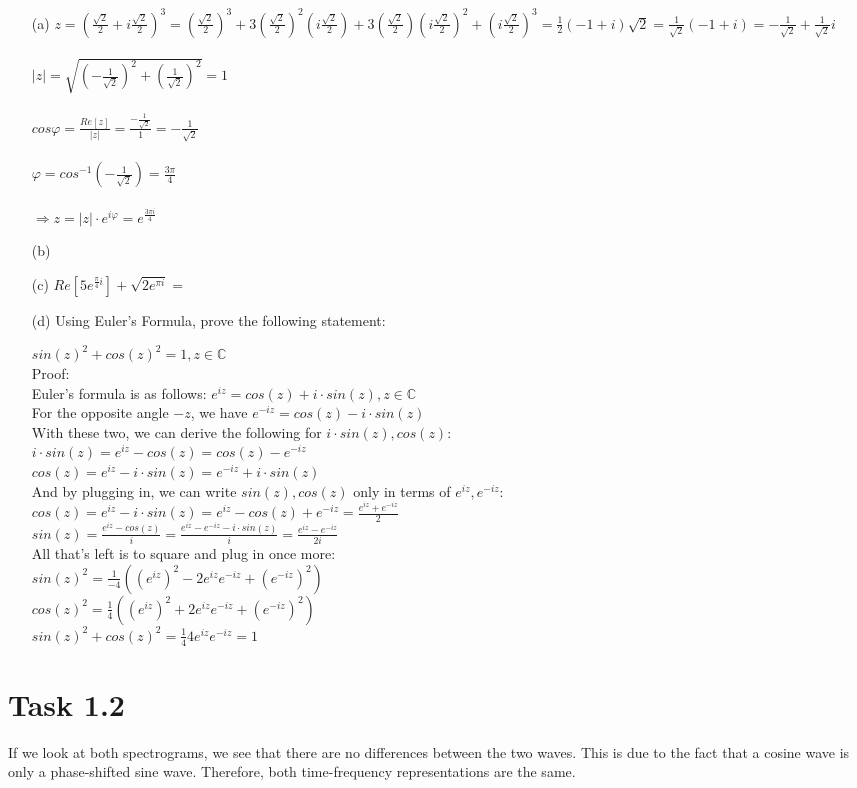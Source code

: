 \documentclass[12pt]{article}
\begin{document}
\begin{itemize}
    \item[(a)]
    $z = (\frac{\sqrt{2}}{2}+i\frac{\sqrt{2}}{2})^{3} = (\frac{\sqrt{2}}{2})^{3} + 3(\frac{\sqrt{2}}{2})^{2}(i\frac{\sqrt{2}}{2}) + 3(\frac{\sqrt{2}}{2})(i\frac{\sqrt{2}}{2})^{2} + (i\frac{\sqrt{2}}{2})^{3} = \frac{1}{2}(-1+i)\sqrt{2}=\frac{1}{\sqrt{2}}(-1+i)=-\frac{1}{\sqrt{2}}+\frac{1}{\sqrt{2}}i$\\\\
    $|z|=\sqrt{(-\frac{1}{\sqrt{2}})^{2}+(\frac{1}{\sqrt{2}})^{2}}=1$\\\\
    $cos\varphi=\frac{Re[z]}{|z|}=\frac{-\frac{1}{\sqrt{2}}}{1}=-\frac{1}{\sqrt{2}}$\\\\
    $\varphi=cos^{-1}(-\frac{1}{\sqrt{2}})=\frac{3\pi}{4}$\\\\
    $\Rightarrow z=|z|\cdot e^{i\varphi}=e^{\frac{3\pi i}{4}}$

    \item[(b)]

    \item[(c)]
    $Re[5e^{\frac{\pi}{4}i}]+\sqrt{2e^{\pi i}} = $
    \item[(d)]
    Using Euler's Formula, prove the following statement:

$sin(z)^2 + cos(z)^2 = 1, z \in \mathbb{C}$\\
Proof:\\
Euler's formula is as follows: $e^{iz} = cos(z) + i \cdot sin(z), z \in \mathbb{C}$\\
For the opposite angle $-z$, we have $e^{-iz} = cos(z) - i \cdot sin(z)$\\
With these two, we can derive the following for $i \cdot sin(z), cos(z)$:\\
$i \cdot sin(z) = e^{iz} - cos(z) = cos(z) - e^{-iz}$\\
$cos(z) = e^{iz} - i \cdot sin(z) = e^{-iz} + i \cdot sin(z)$\\
And by plugging in, we can write $sin(z), cos(z)$ only in terms of $e^{iz}, e^{-iz}$:\\
$cos(z) = e^{iz} - i \cdot sin(z) = e^{iz} - cos(z) + e^{-iz} = \frac{e^{iz} + e^{-iz}}{2}$\\
$sin(z) = \frac{e^{iz} - cos(z)}{i} = \frac{e^{iz} - e^{-iz} - i \cdot sin(z)}{i} =\frac{e^{iz} - e^{-iz}}{2i}$\\
All that's left is to square and plug in once more:\\
$sin(z)^2 = \frac{1}{-4}((e^{iz})^{2} - 2e^{iz}e^{-iz} + (e^{-iz})^2)$\\
$cos(z)^2 = \frac{1}{4}((e^{iz})^{2} + 2e^{iz}e^{-iz} + (e^{-iz})^{2})$\\
$sin(z)^{2} + cos(z)^{2} = \frac{1}{4}4e^{iz}e^{-iz} = 1$\\

\end{itemize}
\section*{Task 1.2}
If we look at both spectrograms, we see that there are no differences between the two waves. This is due to the fact that a cosine wave is only a phase-shifted sine wave. Therefore, both time-frequency representations are the same.
\end{document}
